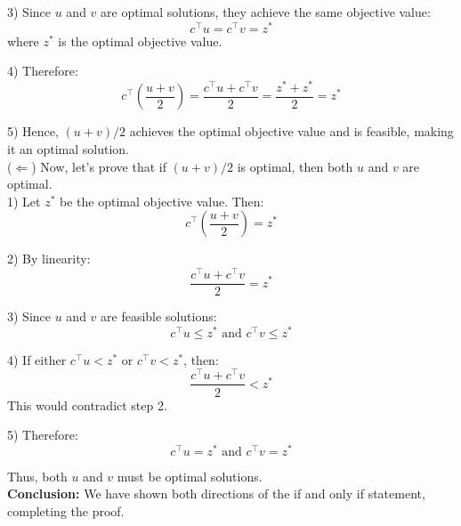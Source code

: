\documentclass{article}
\begin{document}
3) Since $u$ and $v$ are optimal solutions, they achieve the same objective value:
   \[ c^\top u = c^\top v = z^* \]
   where $z^*$ is the optimal objective value.

4) Therefore:
   \[ c^\top(\frac{u + v}{2}) = \frac{c^\top u + c^\top v}{2} = \frac{z^* + z^*}{2} = z^* \]

5) Hence, $(u + v)/2$ achieves the optimal objective value and is feasible, making it an optimal solution. \\

($\Leftarrow$) Now, let's prove that if $(u + v)/2$ is optimal, then both $u$ and $v$ are optimal. \\

1) Let $z^*$ be the optimal objective value. Then:
   \[ c^\top(\frac{u + v}{2}) = z^* \]

2) By linearity:
   \[ \frac{c^\top u + c^\top v}{2} = z^* \]

3) Since $u$ and $v$ are feasible solutions:
   \[ c^\top u \leq z^* \text{ and } c^\top v \leq z^* \]

4) If either $c^\top u < z^*$ or $c^\top v < z^*$, then:
   \[ \frac{c^\top u + c^\top v}{2} < z^* \]
   This would contradict step 2.

5) Therefore:
   \[ c^\top u = z^* \text{ and } c^\top v = z^* \]

Thus, both $u$ and $v$ must be optimal solutions. \\

\textbf{Conclusion:} We have shown both directions of the if and only if statement, completing the proof.
\end{document}
